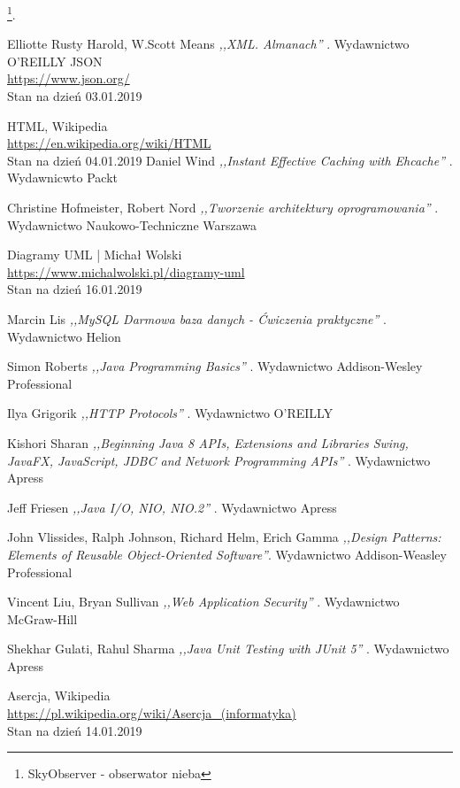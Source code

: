 \documentclass[12pt, twoside]{report}
\begin{document}
\footnote{SkyObserver - obserwator nieba}.  

\begin{thebibliography}{9}
Elliotte Rusty Harold, W.Scott Means \emph{ ,,XML. Almanach'' }. Wydawnictwo O'REILLY
  JSON \\
  \url{https://www.json.org/} \\
  Stan na dzień 03.01.2019

    HTML, Wikipedia \\
	\url{https://en.wikipedia.org/wiki/HTML} \\
	Stan na dzień 04.01.2019
Daniel Wind \emph{ ,,Instant Effective Caching with Ehcache'' }. Wydawnicwto Packt

Christine Hofmeister, Robert Nord \emph{ ,,Tworzenie architektury oprogramowania'' }. Wydawnictwo Naukowo-Techniczne Warszawa

	Diagramy UML | Michał Wolski\\ \url{https://www.michalwolski.pl/diagramy-uml} \\
	Stan na dzień 16.01.2019
	
Marcin Lis \emph{ ,,MySQL Darmowa baza danych - Ćwiczenia praktyczne'' }. Wydawnictwo Helion


Simon Roberts \emph{ ,,Java Programming Basics'' }. Wydawnictwo Addison-Wesley Professional

Ilya Grigorik \emph{ ,,HTTP Protocols'' }. Wydawnictwo O'REILLY

Kishori Sharan \emph{ ,,Beginning Java 8 APIs, Extensions and Libraries Swing, JavaFX, JavaScript, JDBC and Network Programming APIs'' }. Wydawnictwo Apress
 
Jeff Friesen \emph{ ,,Java I/O, NIO, NIO.2'' }. Wydawnictwo Apress

John Vlissides, Ralph Johnson, Richard Helm, Erich Gamma \emph{ ,,Design Patterns: Elements of Reusable Object-Oriented Software''}. Wydawnictwo Addison-Weasley Professional

Vincent Liu, Bryan Sullivan \emph{ ,,Web Application Security'' }. Wydawnictwo McGraw-Hill

Shekhar Gulati, Rahul Sharma \emph{ ,,Java Unit Testing with JUnit 5'' }. Wydawnictwo Apress

Asercja, Wikipedia \\
\url{https://pl.wikipedia.org/wiki/Asercja_(informatyka)} \\
Stan na dzień 14.01.2019

\end{thebibliography}
\end{document}
